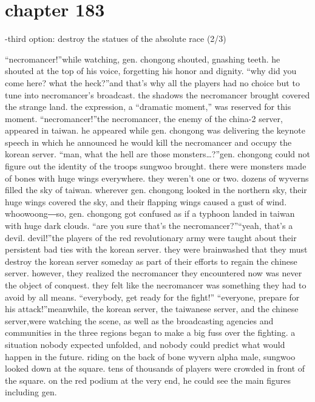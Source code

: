 \section{chapter 183}

                            -third option: destroy the statues of the absolute race (2/3)




“necromancer!”while watching, gen.
 chongong shouted, gnashing teeth.
he shouted at the top of his voice, forgetting his honor and dignity.
“why did you come here? what the heck?”and that’s why all the players had no choice but to tune into necromancer’s broadcast.
the shadows the necromancer brought covered the strange land.
the expression, a “dramatic moment,” was reserved for this moment.
“necromancer!”the necromancer, the enemy of the china-2 server, appeared in taiwan.
he appeared while gen.
 chongong was delivering the keynote speech in which he announced he would kill the necromancer and occupy the korean server.
“man, what the hell are those monsters…?”gen.
 chongong could not figure out the identity of the troops sungwoo brought.
 there were monsters made of bones with huge wings everywhere.
 they weren’t one or two.
 dozens of wyverns filled the sky of taiwan.
wherever gen.
 chongong looked in the northern sky, their huge wings covered the sky, and their flapping wings caused a gust of wind.
whoowoong―so, gen.
 chongong got confused as if a typhoon landed in taiwan with huge dark clouds.
“are you sure that’s the necromancer?”“yeah, that’s a devil.
 devil!”the players of the red revolutionary army were taught about their persistent bad ties with the korean server.
 they were brainwashed that they must destroy the korean server someday as part of their efforts to regain the chinese server.
however, they realized the necromancer they encountered now was never the object of conquest.
 they felt like the necromancer was something they had to avoid by all means.
“everybody, get ready for the fight!”
“everyone, prepare for his attack!”meanwhile, the korean server, the taiwanese server, and the chinese server,were watching the scene, as well as the broadcasting agencies and communities in the three regions began to make a big fuss over the fighting.
a situation nobody expected unfolded, and nobody could predict what would happen in the future.
riding on the back of bone wyvern alpha male, sungwoo looked down at the square.
tens of thousands of players were crowded in front of the square.
 on the red podium at the very end, he could see the main figures including gen.
